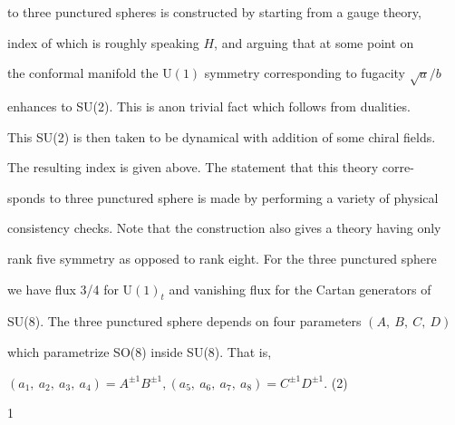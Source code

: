 \documentclass[a4paper,12pt]{article}
\begin{document}
to three punctured spheres is constructed by starting from a gauge theory,

index of which is roughly speaking $H$, and arguing that at some point on

the conformal manifold the $\mathrm{U}(1)$ symmetry corresponding to fugacity $\sqrt{a}/b$

enhances to SU(2). This is anon trivial fact which follows from dualities.

This SU(2) is then taken to be dynamical with addition of some chiral fields.

The resulting index is given above. The statement that this theory corre-

sponds to three punctured sphere is made by performing a variety of physical

consistency checks. Note that the construction also gives a theory having only

rank five symmetry as opposed to rank eight. For the three punctured sphere

we have flux 3/4 for $\mathrm{U}(1)_{t}$ and vanishing flux for the Cartan generators of

SU(8). The three punctured sphere depends on four parameters $(A,\ B,\ C,\ D)$

which parametrize SO(8) inside SU(8). That is,
\begin{center}
$(a_{1},\ a_{2},\ a_{3},\ a_{4})=A^{\pm 1}B^{\pm 1}, (a_{5},\ a_{6},\ a_{7},\ a_{8})=C^{\pm 1}D^{\pm 1}$. (2)
\end{center}
1
\end{document}
